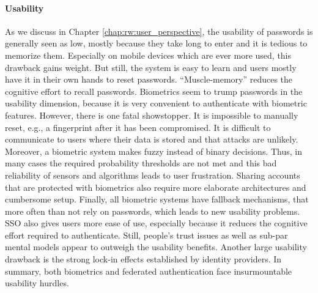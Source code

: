 \paragraph{Usability}
As we discuss in Chapter \ref{chap:rw:user_perspective}, the usability of passwords is generally seen as low, mostly because they take long to enter and it is tedious to memorize them. Especially on mobile devices which are ever more used, this drawback gains weight. But still, the system is easy to learn and users mostly have it in their own hands to reset passwords. ``Muscle-memory'' reduces the cognitive effort to recall passwords. 
Biometrics seem to trump passwords in the usability dimension, because it is very convenient to authenticate with biometric features. However, there is one fatal showstopper. It is impossible to manually reset, e.g., a fingerprint after it has been compromised. It is difficult to communicate to users where their data is stored and that attacks are unlikely. Moreover, a biometric system makes fuzzy instead of binary decisions. Thus, in many cases the required probability thresholds are not met and this bad reliability of sensors and algorithms leads to user frustration. Sharing accounts that are protected with biometrics also require more elaborate architectures and cumbersome setup. Finally, all biometric systems have fallback mechanisms, that more often than not rely on passwords, which leads to new usability problems. SSO also gives users more ease of use, especially because it reduces the cognitive effort required to authenticate. Still, people's trust issues as well as sub-par mental models appear to outweigh the usability benefits. Another large usability drawback is the strong lock-in effects established by identity providers. In summary, both biometrics and federated authentication face insurmountable usability hurdles. 

